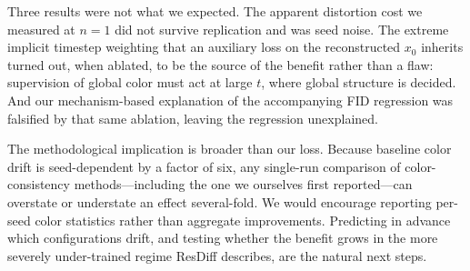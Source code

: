 \documentclass[11pt]{article}
\begin{document}
Three results were not what we expected. The apparent distortion cost we measured
at $n=1$ did not survive replication and was seed noise. The extreme implicit
timestep weighting that an auxiliary loss on the reconstructed $x_0$ inherits
turned out, when ablated, to be the source of the benefit rather than a flaw:
supervision of global color must act at large $t$, where global structure is
decided. And our mechanism-based explanation of the accompanying FID regression
was falsified by that same ablation, leaving the regression unexplained.

The methodological implication is broader than our loss. Because baseline color
drift is seed-dependent by a factor of six, any single-run comparison of
color-consistency methods---including the one we ourselves first
reported---can overstate or understate an effect several-fold. We would encourage
reporting per-seed color statistics rather than aggregate improvements.
Predicting in advance which configurations drift, and testing whether the benefit
grows in the more severely under-trained regime ResDiff describes, are the
natural next steps.
\end{document}
